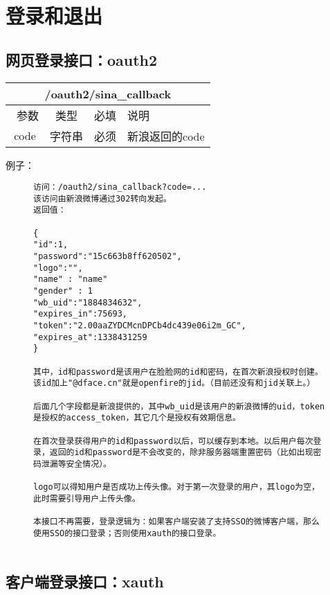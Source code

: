 
\section{登录和退出}
\subsection{网页登录接口：oauth2}


\begin{table}[H]
   \begin{center}
\begin{tabular}{|c|c|c|p{12cm}|}
\hline
\multicolumn{4}{|c|}{/oauth2/sina\_callback} \\
\hline\hline
 \  参数  & 类型 & 必填 &  说明  \\
\hline
 code  & 字符串 & 必须 &  新浪返回的code\\
\hline
\end{tabular}
   \end{center}
\end{table}


例子：

\begin{figure}[H]
\begin{verbatim}
访问：/oauth2/sina_callback?code=...
该访问由新浪微博通过302转向发起。
返回值：

{
"id":1,
"password":"15c663b8ff620502",
"logo":"",
"name" : "name"
"gender" : 1
"wb_uid":"1884834632",
"expires_in":75693,
"token":"2.00aaZYDCMcnDPCb4dc439e06i2m_GC",
"expires_at":1338431259
}

其中，id和password是该用户在脸脸网的id和密码，在首次新浪授权时创建。该id加上"@dface.cn"就是openfire的jid。（目前还没有和jid关联上。）

后面几个字段都是新浪提供的，其中wb_uid是该用户的新浪微博的uid，token是授权的access_token，其它几个是授权有效期信息。

在首次登录获得用户的id和password以后，可以缓存到本地。以后用户每次登录，返回的id和password是不会改变的，除非服务器端重置密码（比如出现密码泄漏等安全情况）。

logo可以得知用户是否成功上传头像。对于第一次登录的用户，其logo为空，此时需要引导用户上传头像。

本接口不再需要，登录逻辑为：如果客户端安装了支持SSO的微博客户端，那么使用SSO的接口登录；否则使用xauth的接口登录。


\end{verbatim}
\end{figure}

\subsection{客户端登录接口：xauth}
\label{hash_algorithm}

